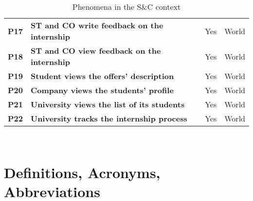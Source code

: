 \begin{table}[H]
\begin{tabular}{|c|p{24em}|c|c|}
    \small\textbf{P17} &\small \textbf{ST and CO write feedback on the internship} & Yes & World \T\B\\
    \small\textbf{P18} &\small \textbf{ST and CO view feedback on the internship} & Yes & World \B\\
    \small\textbf{P19} &\small \textbf{Student views the offers' description} & Yes & World \T\B \\
    \small\textbf{P20} &\small \textbf{Company views the students' profile} & Yes & World \T\B\\
    \small\textbf{P21} &\small \textbf{University views the list of its students} & Yes & World \B\\
    \small\textbf{P22} &\small \textbf{University tracks the internship process} & Yes & World \T\B\\
    \hline
    \end{tabular}
    \\[10pt]
    \caption{Phenomena in the S\&C context}\label{table:phenomena}
\end{table}

\section{Definitions, Acronyms, Abbreviations}\label{sec:definitions}
